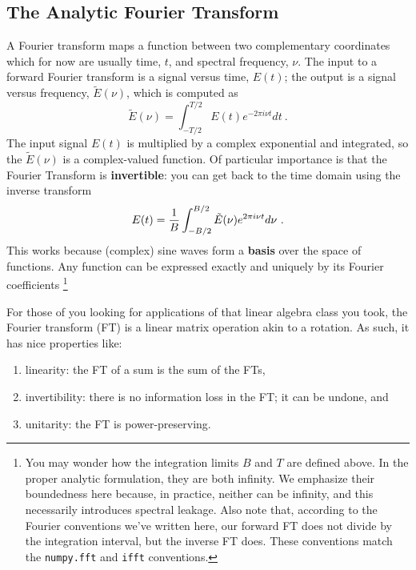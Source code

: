 \documentclass[11pt,preprint]{aastex}
\begin{document}
\subsection{The Analytic Fourier Transform}

\noindent
A Fourier transform maps a function between two complementary coordinates which
for now are usually time, $t$, and spectral frequency, $\nu$.
The input to a forward Fourier transform is a signal versus time, 
$E(t)$; the output is a signal versus frequency, $\tilde E(\nu)$,
which is computed as
% 
\begin{equation}
\tilde E(\nu) = \int_{-T/2}^{T/2} E(t) e^{-2 \pi i \nu t} dt \ .
\label{eq:dft}
\end{equation}
% 
\noindent The input signal $E(t)$ is multiplied by a complex
exponential and integrated, so the $\tilde E(\nu)$ is a complex-valued function. Of particular
importance is that the Fourier Transform is {\bf invertible}: 
you can get back to the time domain using the inverse transform
%
\begin{equation}
E(t) = {1 \over B} \int_{-B/2}^{B/2} \tilde E(\nu) e^{2 \pi i \nu t} d\nu \ .
\end{equation}
% 
This works because (complex) sine waves form a {\bf basis} over the space of functions.
Any function can be expressed exactly and uniquely by its Fourier coefficients
\footnote{You may wonder how
the integration limits $B$ and $T$ are defined above. In the proper
analytic formulation, they are both infinity. We emphasize their
boundedness here because, in practice, 
neither can be infinity, and this necessarily introduces spectral leakage. Also note that,
according to the Fourier conventions we've written here, our forward FT does not divide
by the integration interval, but the inverse FT does.  These conventions match 
the {\tt numpy.fft}
and {\tt ifft} conventions.}

For those of you looking for applications of that linear algebra class you took,
the Fourier transform (FT) is a linear matrix operation akin to a rotation. 
As such, it has nice properties like:
\begin{enumerate}
\item linearity: the FT
of a sum is the sum of the FTs, 
\item invertibility: there is no information loss in the FT; it can be undone, and 
\item unitarity: the FT is power-preserving.
\end{enumerate}
\end{document}
